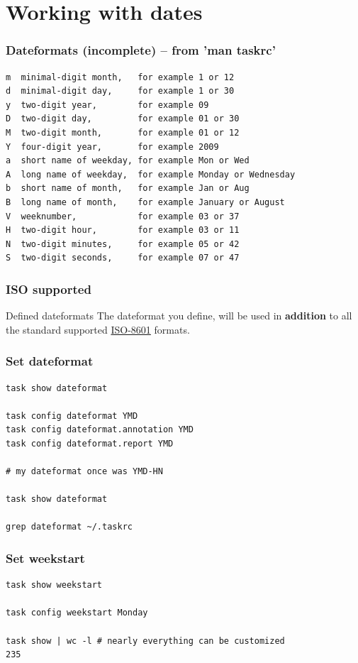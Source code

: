 \documentclass[t,handout]{beamer}
\begin{document}
\section{Working with dates}

\begin{frame}[fragile]\frametitle{Dateformats (incomplete) -- from 'man taskrc'}
    \vfill
    \begin{lstlisting}
m  minimal-digit month,   for example 1 or 12
d  minimal-digit day,     for example 1 or 30
y  two-digit year,        for example 09
D  two-digit day,         for example 01 or 30
M  two-digit month,       for example 01 or 12
Y  four-digit year,       for example 2009
a  short name of weekday, for example Mon or Wed
A  long name of weekday,  for example Monday or Wednesday
b  short name of month,   for example Jan or Aug
B  long name of month,    for example January or August
V  weeknumber,            for example 03 or 37
H  two-digit hour,        for example 03 or 11
N  two-digit minutes,     for example 05 or 42
S  two-digit seconds,     for example 07 or 47\end{lstlisting}
\end{frame}

\begin{frame}[fragile]\frametitle{ISO supported}
    \vfill
    \begin{alertblock}{Defined dateformats}
        The dateformat you define, will be used in \textbf{addition} to all the standard supported \href{https://en.wikipedia.org/wiki/ISO_8601}{ISO-8601} formats.
    \end{alertblock}
\end{frame}

\begin{frame}[fragile]\frametitle{Set dateformat}
    \vfill
    \begin{lstlisting}
task show dateformat

task config dateformat YMD
task config dateformat.annotation YMD
task config dateformat.report YMD

# my dateformat once was YMD-HN

task show dateformat

grep dateformat ~/.taskrc\end{lstlisting}
\end{frame}

\begin{frame}[fragile]\frametitle{Set weekstart}
    \vfill
    \begin{lstlisting}
task show weekstart

task config weekstart Monday

task show | wc -l # nearly everything can be customized
235\end{lstlisting}
\end{frame}
\end{document}
